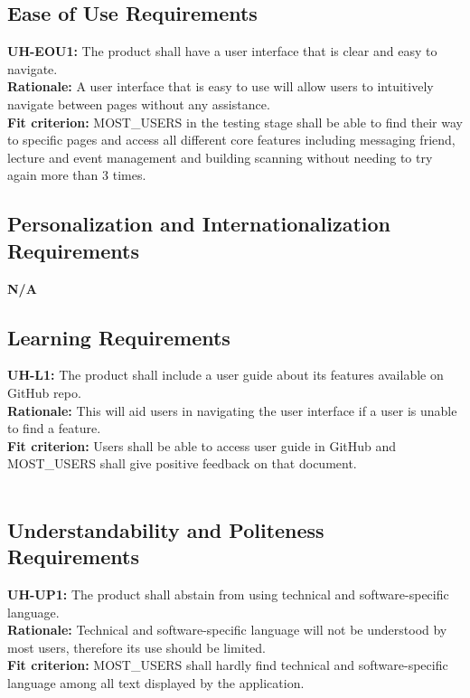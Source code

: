 \documentclass[12pt]{article}
\begin{document}
\subsection{Ease of Use Requirements}
  \textbf{UH-EOU1:} The product shall have a user interface that is clear and easy to navigate.\\
  \textbf{Rationale:} A user interface that is easy to use will allow users to intuitively navigate between pages without any assistance.\\
  \textbf{Fit criterion:} MOST\_USERS in the testing stage shall be able to find their way to specific pages and access all different core features including messaging friend, lecture and event management and building scanning without needing to try again more than 3 times.\\

\subsection{Personalization and Internationalization Requirements}
  \textbf{N/A}\\

\subsection{Learning Requirements}
  \textbf{UH-L1:} The product shall include a user guide about its features available on GitHub repo.\\
  \textbf{Rationale:} This will aid users in navigating the user interface if a user is unable to find a feature.\\
  \textbf{Fit criterion:} Users shall be able to access user guide in GitHub and MOST\_USERS shall give positive feedback on that document.\\\\

\subsection{Understandability and Politeness Requirements}
  \textbf{UH-UP1:} The product shall abstain from using technical and software-specific language.\\
  \textbf{Rationale:} Technical and software-specific language will not be understood by most users, therefore its use should be limited.\\
  \textbf{Fit criterion:} MOST\_USERS shall hardly find technical and software-specific language among all text displayed by the application.\\
\end{document}
